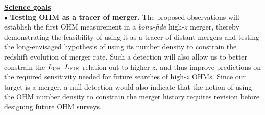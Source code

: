 \documentclass[letterpaper,11pt]{article}
\newcommand{\LFIR}{\mbox{$L_{\rm FIR}$}\xspace}
\newcommand{\LOH}{$L_{\rm OH}$\xspace}
\newcommand{\obs}{observations\xspace}
\begin{document}
\noindent \underline{\textbf{Science goals}}
\vspace{.2em}\\
$\bullet$ {\bf Testing OHM as a tracer of merger.}
The proposed \obs will establish the first OHM measurement in a {\it bona-fide} high-$z$ merger, thereby
demonstrating the feasibility of using it as a tracer of distant mergers and
testing the long-envisaged hypothesis of using its number density to constrain
the redshift evolution of merger rate.
Such a detection will also allow us to better constrain the
\LOH-\LFIR relation out to higher $z$, %
and thus improve predictions on the required sensitivity needed for future searches of high-$z$ OHMs.
Since our target is a merger,
a null detection would also indicate that the notion of
using the OHM number density to constrain the merger history requires revision before designing future OHM surveys.
\end{document}

